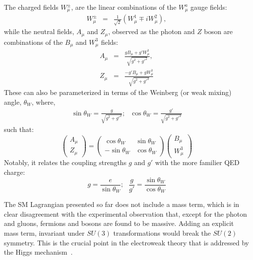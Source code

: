 The charged fields $W^{\pm}_\mu$, are the linear combinations of the $W_{\mu}^{a}$ gauge fields: 
\begin{eqnarray}
W_{\mu}^{\pm} & = & \frac{1}{\sqrt{2}}(W^{1}_{\mu}\mp iW^{2}_{\mu}),
\end{eqnarray}
while the neutral fields, $A_\mu$ and $Z_{\mu}$, observed as the photon and $Z$ boson are combinations of the $B_{\mu}$ and $W_{\mu}^{3}$ fields:
\begin{eqnarray}
A_{\mu} & = & \frac{gB_{\mu} + g'W_{\mu}^{3}}{\sqrt{g^{2} + g'^{2}}}, \\
Z_{\mu} & = & \frac{-g'B_{\mu} + gW_{\mu}^{3}}{\sqrt{g^{2} + g'^{2}}}
\label{eq:AZ}
\end{eqnarray}
These can also be parameterized in terms of the Weinberg (or weak mixing) angle, $\theta_{W}$, where,
\begin{eqnarray}
\sin\theta_{W}  =  \frac{g}{\sqrt{g^{2} + g'^{2}}}; \:\:\:
\cos\theta_{W}  =  \frac{g'}{\sqrt{g^{2} + g'^{2}}}
\end{eqnarray}
such that:
\begin{equation}
\left(\begin{array}{c} A_{\mu} \\ Z_{\mu} \end{array}\right) =
\left(\begin{array}{cc} \cos\theta_{W} & \sin\theta_{W} \\ -\sin\theta_{W} & \cos\theta_{W} \end{array}\right)
\left(\begin{array}{c} B_{\mu} \\ W_{\mu}^{3} \end{array}\right)
\end{equation}
Notably, it relates the coupling strengths $g$ and $g'$ with the more familier QED charge:
\begin{equation}
g = \frac{e}{\sin\theta_{W}}; \:\:\: \frac{g}{g'} = \frac{\sin\theta_{W}}{\cos\theta_{W}}
\end{equation}

The SM Lagrangian presented so far does not include a mass term, which is in clear disagreement with the experimental observation that, except for
the photon and gluons, fermions and bosons are found to be massive. Adding an explicit mass term, invariant under $SU(3)$ transformations would
break the $SU(2)$ symmetry. This is the crucial point in the electroweak theory that is addressed by the 
Higgs mechanism~\cite{Higgs:1964pj, Higgs:1966ev, Englert:1964et, Guralnik:1964eu}. 

